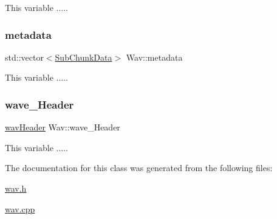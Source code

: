 This variable ..... 

\mbox{\label{classWav_ae6078b0bc65f5bcf4c2b7e3e7b4cf8bf}} 
\subsubsection{\texorpdfstring{metadata}{metadata}}
{\footnotesize\ttfamily std\+::vector$<$\hyperlink{structSubChunkData}{Sub\+Chunk\+Data}$>$ Wav\+::metadata\hspace{0.3cm}{\ttfamily [protected]}}



This variable ..... 

\mbox{\label{classWav_a3d95345a678bba0772e48325306ecda1}} 
\subsubsection{\texorpdfstring{wave\+\_\+\+Header}{wave\_Header}}
{\footnotesize\ttfamily \hyperlink{structwavHeader}{wav\+Header} Wav\+::wave\+\_\+\+Header\hspace{0.3cm}{\ttfamily [protected]}}



This variable ..... 



The documentation for this class was generated from the following files\+:\begin{DoxyCompactItemize}
\item 
\hyperlink{wav_8h}{wav.\+h}\item 
\hyperlink{wav_8cpp}{wav.\+cpp}\end{DoxyCompactItemize}

